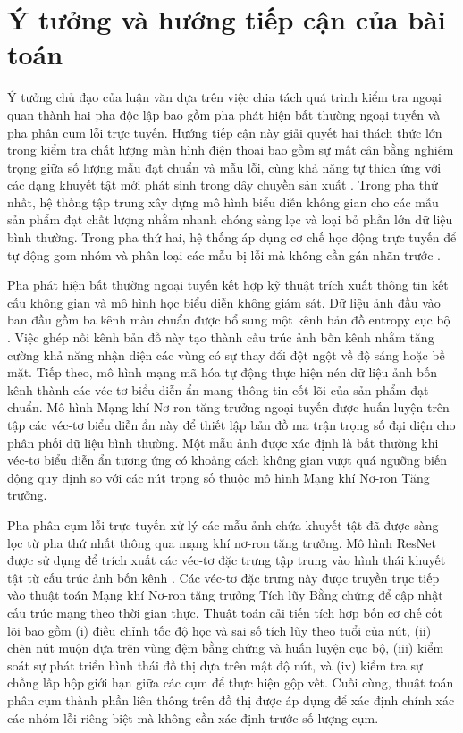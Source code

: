 \section{Ý tưởng và hướng tiếp cận của bài toán}

Ý tưởng chủ đạo của luận văn dựa trên việc chia tách quá trình kiểm tra ngoại quan thành hai pha độc lập bao gồm pha phát hiện bất thường ngoại tuyến và pha phân cụm lỗi trực tuyến. Hướng tiếp cận này giải quyết hai thách thức lớn trong kiểm tra chất lượng màn hình điện thoại bao gồm sự mất cân bằng nghiêm trọng giữa số lượng mẫu đạt chuẩn và mẫu lỗi, cùng khả năng tự thích ứng với các dạng khuyết tật mới phát sinh trong dây chuyền sản xuất \cite{goodfellow2016deep}. Trong pha thứ nhất, hệ thống tập trung xây dựng mô hình biểu diễn không gian cho các mẫu sản phẩm đạt chất lượng nhằm nhanh chóng sàng lọc và loại bỏ phần lớn dữ liệu bình thường. Trong pha thứ hai, hệ thống áp dụng cơ chế học động trực tuyến để tự động gom nhóm và phân loại các mẫu bị lỗi mà không cần gán nhãn trước \cite{fritzke1995growing}.

Pha phát hiện bất thường ngoại tuyến kết hợp kỹ thuật trích xuất thông tin kết cấu không gian và mô hình học biểu diễn không giám sát. Dữ liệu ảnh đầu vào ban đầu gồm ba kênh màu chuẩn được bổ sung một kênh bản đồ entropy cục bộ \cite{shannon1948mathematical}. Việc ghép nối kênh bản đồ này tạo thành cấu trúc ảnh bốn kênh nhằm tăng cường khả năng nhận diện các vùng có sự thay đổi đột ngột về độ sáng hoặc bề mặt. Tiếp theo, mô hình mạng mã hóa tự động thực hiện nén dữ liệu ảnh bốn kênh thành các véc-tơ biểu diễn ẩn mang thông tin cốt lõi của sản phẩm đạt chuẩn. Mô hình Mạng khí Nơ-ron tăng trưởng ngoại tuyến được huấn luyện trên tập các véc-tơ biểu diễn ẩn này để thiết lập bản đồ ma trận trọng số đại diện cho phân phối dữ liệu bình thường. Một mẫu ảnh được xác định là bất thường khi véc-tơ biểu diễn ẩn tương ứng có khoảng cách không gian vượt quá ngưỡng biến động quy định so với các nút trọng số thuộc mô hình Mạng khí Nơ-ron Tăng trưởng.

Pha phân cụm lỗi trực tuyến xử lý các mẫu ảnh chứa khuyết tật đã được sàng lọc từ pha thứ nhất thông qua mạng khí nơ-ron tăng trưởng. Mô hình ResNet được sử dụng để trích xuất các véc-tơ đặc trưng tập trung vào hình thái khuyết tật từ cấu trúc ảnh bốn kênh \cite{he2016deep}. Các véc-tơ đặc trưng này được truyền trực tiếp vào thuật toán Mạng khí Nơ-ron tăng trưởng Tích lũy Bằng chứng để cập nhật cấu trúc mạng theo thời gian thực. Thuật toán cải tiến tích hợp bốn cơ chế cốt lõi bao gồm (i) điều chỉnh tốc độ học và sai số tích lũy theo tuổi của nút, (ii) chèn nút muộn dựa trên vùng đệm bằng chứng và huấn luyện cục bộ, (iii) kiểm soát sự phát triển hình thái đồ thị dựa trên mật độ nút, và (iv) kiểm tra sự chồng lấp hộp giới hạn giữa các cụm để thực hiện gộp vết. Cuối cùng, thuật toán phân cụm thành phần liên thông trên đồ thị được áp dụng để xác định chính xác các nhóm lỗi riêng biệt mà không cần xác định trước số lượng cụm.

